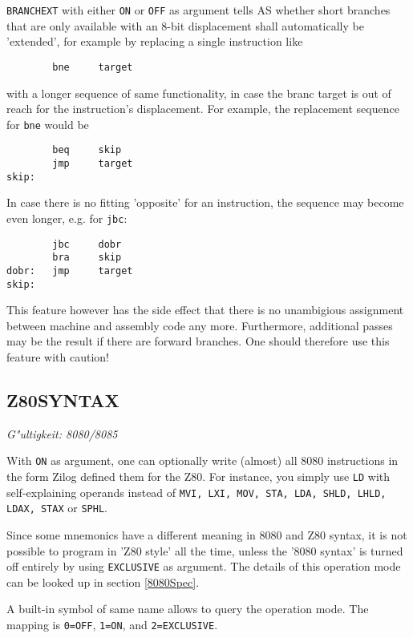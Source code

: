 \documentclass[12pt,twoside]{report}
\makeatletter
\newcommand{\tty}[1]{{\tt #1}}
\newcommand{\ttindex}[1]{\index{#1@{\tt #1}}}
\makeatother
\begin{document}
{\tt BRANCHEXT} with either \tty{ON} or \tty{OFF} as argument tells AS
whether short branches that are only available with an 8-bit displacement
shall automatically be 'extended', for example by replacing a single
instruction like
\begin{verbatim}
        bne     target
\end{verbatim}
with a longer sequence of same functionality, in case the branc target is
out of reach for the instruction's displacement.  For example, the
replacement sequence for {\tt bne} would be
\begin{verbatim}
        beq     skip
        jmp     target
skip:
\end{verbatim}
In case there is no fitting 'opposite' for an instruction, the sequence
may become even longer, e.g. for {\tt jbc}:
\begin{verbatim}
        jbc     dobr
        bra     skip
dobr:   jmp     target
skip:
\end{verbatim}
This feature however has the side effect that there is no unambigious
assignment between machine and assembly code any more.  Furthermore,
additional passes may be the result if there are forward branches.  One
should therefore use this feature with caution!


\subsection{Z80SYNTAX}
\ttindex{Z80SYNTAX}

{\em G"ultigkeit: 8080/8085}

With \tty{ON} as argument, one can optionally write (almost) all
8080 instructions in the form Zilog defined them for the Z80.
For instance, you simply use \tty{LD} with self-explaining
operands instead of \tty{MVI, LXI, MOV, STA, LDA, SHLD, LHLD,
LDAX, STAX} or \tty{SPHL}.

Since some mnemonics have a different meaning in 8080 and Z80
syntax, it is not possible to program in 'Z80 style' all the
time, unless the '8080 syntax' is turned off entirely by using
 \tty{EXCLUSIVE} as argument.  The details of this operation mode
can be looked up in section \ref{8080Spec}.

A built-in symbol of same name allows to query the operation mode.
The mapping is \tty{0=OFF}, \tty{1=ON}, and \tty{2=EXCLUSIVE}.

\end{document}

